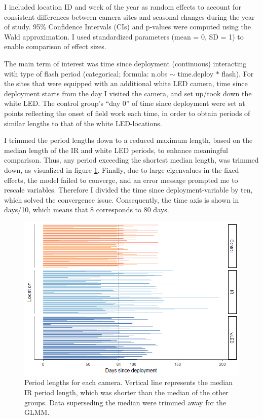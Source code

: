 I included location ID and week of the year as random effects to account for consistent differences between camera sites and seasonal changes during the year of study.
95\% Confidence Intervals (CIs) and p-values were computed using the Wald approximation.
I used standardized parameters (mean = 0, SD = 1) to enable comparison of effect sizes.

The main term of interest was time since deployment (continuous) interacting with type of flash period (categorical; formula: n.obs $\sim$ time.deploy $\ast$ flash).
For the sites that were equipped with an additional white LED camera, time since deployment starts from the day I visited the camera, and set up/took down the white LED.
The control group’s “day 0” of time since deployment were set at points reflecting the onset of field work each time, in order to obtain periods of similar lengths to that of the white LED-locations.

I trimmed the period lengths down to a reduced maximum length, based on the median length of the IR and white LED periods, to enhance meaningful comparison.
Thus, any period exceeding the shortest median length, was trimmed down, as visualized in figure \ref{fig:median_period}.
Finally, due to large eigenvalues in the fixed effects, the model failed to converge, and an error message prompted me to rescale variables.
Therefore I divided the time since deployment-variable by ten, which solved the convergence issue.
Consequently, the time axis is shown in days/10, which means that 8 corresponds to 80 days. %


\begin{figure}
	\centering
	\includegraphics[scale=.8]{../R/glmm_sp_files/figure-html/period-length-wControl-1.png}
	\caption[Period lengths]
	{Period lengths for each camera. %
	Vertical line represents the median IR period length, which was shorter than the median of the other groups. Data superseding the median were trimmed away for the GLMM. \label{fig:median_period}}
\end{figure}

